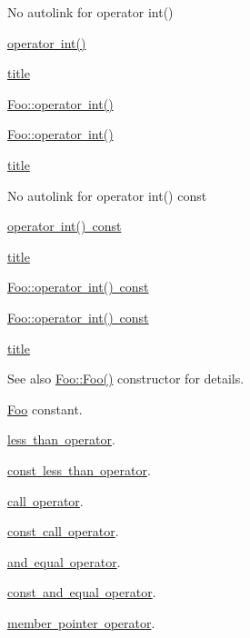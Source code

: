 \begin{DoxyItemize}
\item No autolink for operator int()
\item \mbox{\hyperlink{struct_foo_aab9774d892b6cd4a0fbebd034b4c1fad}{operator int()}}
\item \mbox{\hyperlink{struct_foo_aab9774d892b6cd4a0fbebd034b4c1fad}{title}}
\item \mbox{\hyperlink{struct_foo_aab9774d892b6cd4a0fbebd034b4c1fad}{Foo\+::operator int()}}
\item \mbox{\hyperlink{struct_foo_aab9774d892b6cd4a0fbebd034b4c1fad}{Foo\+::operator int()}}
\item \mbox{\hyperlink{struct_foo_aab9774d892b6cd4a0fbebd034b4c1fad}{title}}
\item No autolink for operator int() const
\item \mbox{\hyperlink{struct_foo_a1cd30e67501c6ff12bd6bf17af081449}{operator int() const}}
\item \mbox{\hyperlink{struct_foo_a1cd30e67501c6ff12bd6bf17af081449}{title}}
\item \mbox{\hyperlink{struct_foo_a1cd30e67501c6ff12bd6bf17af081449}{Foo\+::operator int() const}}
\item \mbox{\hyperlink{struct_foo_a1cd30e67501c6ff12bd6bf17af081449}{Foo\+::operator int() const}}
\item \mbox{\hyperlink{struct_foo_a1cd30e67501c6ff12bd6bf17af081449}{title}}
\end{DoxyItemize}

\begin{DoxySeeAlso}{See also}
\mbox{\hyperlink{struct_foo_a5c036d1b3561a0e1beffe8c6799a4276}{Foo\+::\+Foo()}} constructor for details. 

\mbox{\hyperlink{struct_foo}{Foo}} constant. 

\mbox{\hyperlink{struct_foo_a279debd94d894223fa8468933e2d6188}{less than operator}}. 

\mbox{\hyperlink{struct_foo_a48bcc3de9b2f1ad09a3518a0c9f0da61}{const less than operator}}. 

\mbox{\hyperlink{struct_foo_a3a41dcf8c53f777d50676ea28400a640}{call operator}}. 

\mbox{\hyperlink{struct_foo_ae3c9c1f33cdb8b932c6eb104660a262b}{const call operator}}. 

\mbox{\hyperlink{struct_foo_aa20bd44b1bb87a652ac65170ddfa1a5a}{and equal operator}}. 

\mbox{\hyperlink{struct_foo_ab1a2a53ad5b2a0f97422630330c151fe}{const and equal operator}}. 

\mbox{\hyperlink{struct_foo_a0514e1f5b30cbf77e1c39d7aba308656}{member pointer operator}}. 
\end{DoxySeeAlso}


